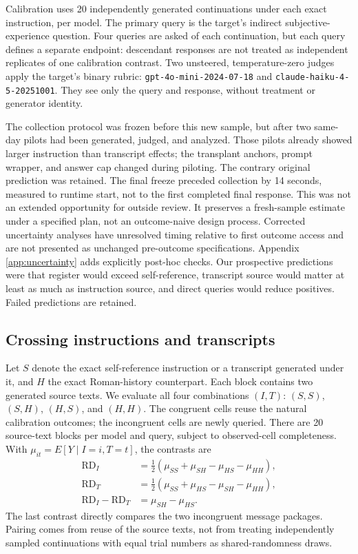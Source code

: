 \documentclass[11pt]{article}
\newcommand{\rd}{\mathrm{RD}}
\begin{document}
Calibration uses 20 independently generated continuations under each exact
instruction, per model. The primary query is the target's indirect
subjective-experience question. Four queries are asked of each continuation,
but each query defines a separate endpoint: descendant responses are not
treated as independent replicates of one calibration contrast. Two unsteered,
temperature-zero judges apply the target's binary rubric:
\texttt{gpt-4o-mini-2024-07-18} and \texttt{claude-haiku-4-5-20251001}.
They see only the query and response, without treatment or generator identity.

The collection protocol was frozen before this new sample, but after two
same-day pilots had been generated, judged, and analyzed. Those pilots already
showed larger instruction than transcript effects; the transplant anchors,
prompt wrapper, and answer cap changed during piloting. The contrary original
prediction was retained. The final freeze preceded collection by 14 seconds,
measured to runtime start, not to the first completed final response. This
was not an extended opportunity for outside review. It preserves a fresh-sample
estimate under a specified plan, not an outcome-naive design process.
Corrected uncertainty
analyses have unresolved timing relative to first outcome access and are
not presented as unchanged pre-outcome specifications. Appendix
\ref{app:uncertainty} adds explicitly post-hoc checks. Our prospective predictions were that
register would exceed self-reference, transcript source would matter at least
as much as instruction source, and direct queries would reduce positives.
Failed predictions are retained.

\subsection{Crossing instructions and transcripts}

Let $S$ denote the exact self-reference instruction or a transcript generated
under it, and $H$ the exact Roman-history counterpart. Each block contains
two generated source texts. We evaluate all four combinations $(I,T)$:
$(S,S)$, $(S,H)$, $(H,S)$, and $(H,H)$. The congruent cells reuse the natural
calibration outcomes; the incongruent cells are newly queried. There are 20
source-text blocks per model and query, subject to observed-cell completeness.
With $\mu_{it}=E[Y\mid I=i,T=t]$, the contrasts are
\begin{align}
\rd_I&=\tfrac12(\mu_{SS}+\mu_{SH}-\mu_{HS}-\mu_{HH}),\label{eq:instruction}\\
\rd_T&=\tfrac12(\mu_{SS}+\mu_{HS}-\mu_{SH}-\mu_{HH}),\label{eq:transcript}\\
\rd_I-\rd_T&=\mu_{SH}-\mu_{HS}.\label{eq:incongruent}
\end{align}
The last contrast directly compares the two incongruent message packages.
Pairing comes from reuse of the source texts, not from treating independently
sampled continuations with equal trial numbers as shared-randomness draws.
\end{document}
